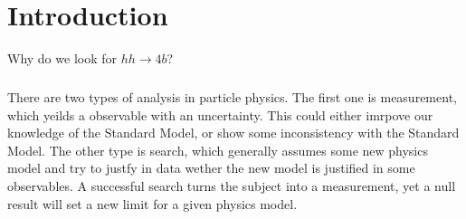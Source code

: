 \chapter{Introduction}
\label{introduction}
Why do we look for $hh\to 4b$?

\paragraph{}
There are two types of analysis in particle physics. The first one is measurement, which yeilds a observable with an uncertainty. This could either imrpove our knowledge of the Standard Model, or show some inconsistency with the Standard Model. The other type is search, which generally assumes some new physics model and try to justfy in data wether the new model is justified in some observables. A successful search turns the subject into a measurement, yet a null result will set a new limit for a given physics model.


